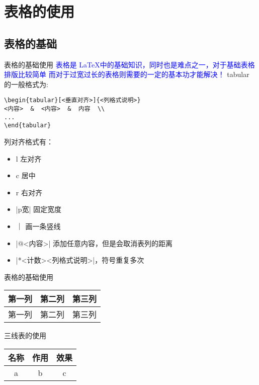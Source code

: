 \section{表格的使用}
\subsection{表格的基础}

\begin{frame}[fragile]{表格的基础使用}
	\phantom{幻影} \textcolor{blue}{表格是 \LaTeX 中的基础知识，同时也是难点之一，对于基础表格排版比较简单
	而对于过宽过长的表格则需要的一定的基本功才能解决！}
tabular  的一般格式为:

\begin{lstlisting}
\begin{tabular}[<垂直对齐>]{<列格式说明>}
<内容>  &  <内容>  &  内容  \\
...
\end{tabular}
\end{lstlisting}
列对齐格式有：
\begin{itemize}
	\item l  左对齐 
	\item c  居中
	\item r  右对齐
	\item |p{宽}| 固定宽度
	\item ｜  画一条竖线
	\item |@{<内容>}| 添加任意内容，但是会取消表列的距离
	\item |*{<计数>}{<列格式说明>}|，符号重复多次
\end{itemize}
\end{frame}



\begin{frame}[fragile]{表格的基础使用}

{
\begin{LTXexample}[pos=r,scaled]
\begin{tabular}{|c|c|c|}
\hline
第一列  &  第二列  & 第三列  \\
\hline 
第一列  &  第二列  & 第三列  \\
\hline 
\end{tabular}
\end{LTXexample}
}
三线表的使用
\smallskip
{\setlength\ResultBoxSep{3mm}
\begin{LTXexample}[pos=r,width=4cm]
\begin{tabular}{ccc}
\toprule
名称  &  作用  &  效果  \\
\bottomrule
a   &   b    &  c  \\
\bottomrule[0.1em]  
\end{tabular}
\end{LTXexample}
}
\end{frame}


